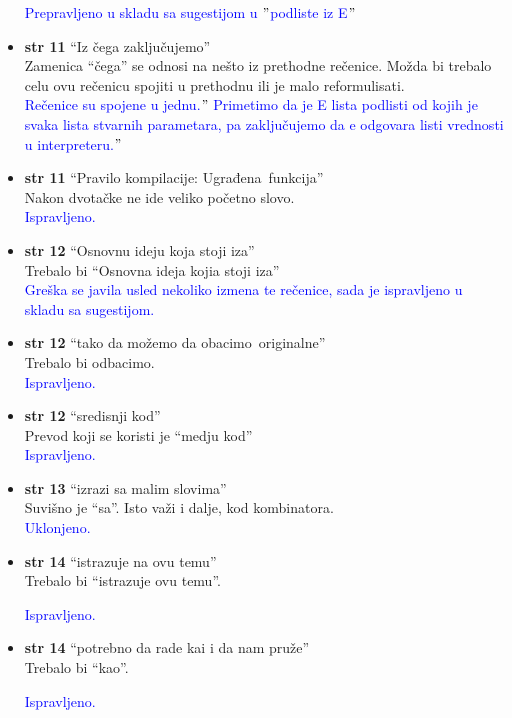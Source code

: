 \documentclass[a4paper]{report}
\newcommand{\odgovor}[1]{\textcolor{blue}{#1}}
\begin{document}
\begin{itemize}
\odgovor{Prepravljeno u skladu sa sugestijom u $"$podliste iz E$"$}

\item \textbf{str 11} ``Iz čega zaključujemo'' \\ Zamenica ``čega'' se odnosi na nešto iz prethodne rečenice. Možda bi trebalo celu ovu rečenicu spojiti u prethodnu ili je malo reformulisati.\\

\odgovor{Rečenice su spojene u jednu.$"$ Primetimo da je E lista podlisti od kojih je svaka lista stvarnih parametara, pa zaključujemo da e odgovara listi vrednosti u interpreteru.$"$}

\item \textbf{str 11} ``Pravilo kompilacije: \color{blue}Ugrađena\color{black}~funkcija'' \\ Nakon dvotačke ne ide veliko početno slovo.\\

\odgovor{Ispravljeno.}

\item \textbf{str 12} ``Osnovnu ideju koja stoji iza'' \\ Trebalo bi ``Osnovna ideja kojia stoji iza''\\

\odgovor{Greška se javila usled nekoliko izmena te rečenice, sada je ispravljeno u skladu sa sugestijom.}

\item \textbf{str 12} ``tako da možemo da \color{blue}obacimo\color{black}~originalne'' \\ Trebalo bi \color{blue}odbacimo\color{black}.\\

\odgovor{Ispravljeno.}

\item \textbf{str 12} ``sredisnji kod'' \\ Prevod koji se koristi je ``medju 
kod''\\

\odgovor{Ispravljeno.}

\item \textbf{str 13} ``izrazi \color{blue}sa\color{black} malim slovima'' \\ Suvišno je ``sa''. Isto važi i dalje, kod kombinatora.\\

\odgovor{Uklonjeno.}

\item \textbf{str 14} ``istrazuje na ovu temu'' \\ Trebalo bi ``istrazuje ovu temu''.

\odgovor{Ispravljeno.}

\item \textbf{str 14} ``potrebno da rade \color{blue}kai\color{black} i da nam pruže'' \\ Trebalo bi ``kao''.

\odgovor{Ispravljeno.}

\end{itemize}
\end{document}
